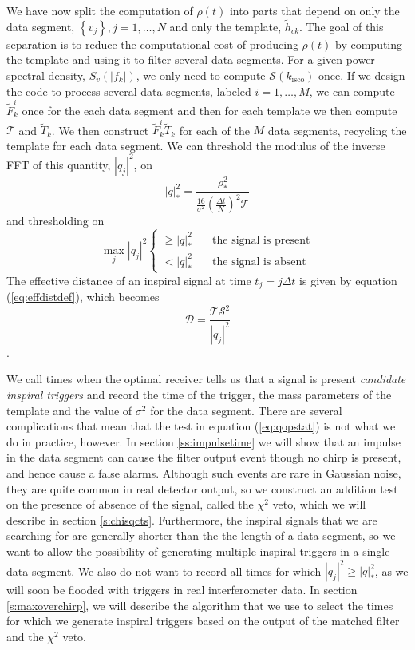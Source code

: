 We have now split the computation of $\rho(t)$ into parts that depend on only
the data segment, $\left\{v_j\right\}, j = 1,\ldots,N$ and only the template,
$\tilde{h}_{ck}$. The goal of this separation is to reduce the computational
cost of producing $\rho(t)$ by computing the template and using it to filter
several data segments. For a given power spectral density, $S_v(|f_k|)$, we
only need to compute $\mathcal{S}(k_\mathrm{isco})$ once. If we design the
code to process several data segments, labeled $i = 1,\ldots,M$, we can
compute $\tilde{F}_k^i$ once for the each data segment and then for each
template we then compute $\mathcal{T}$ and $\tilde{T}_k$. We then construct
$\tilde{F}_k^i\tilde{T}_k$ for each of the $M$ data segments, recycling the
template for each data segment. We can threshold the modulus of the inverse
FFT of this quantity, $|q_j|^2$, on
\begin{equation}
|q|^2_\ast = \frac{\rho^2_\ast} 
{\frac{16}{\sigma^2}\left(\frac{\Delta t}{N}\right)^2 \mathcal{T}}
\end{equation}
and thresholding on 
\begin{equation}
\max_{j} |q_j|^2 
\begin{cases}
\ge |q|^2_\ast &\quad \text{the signal is present}\\
< |q|^2_\ast &\quad \text{the signal is absent}
\end{cases}
\label{eq:qopstat}
\end{equation}
The effective distance of an
inspiral signal at time $t_j = j\Delta t$ is given by equation
(\ref{eq:effdistdef}), which becomes
\begin{equation}
\mathcal{D} = \frac{\mathcal{T}\mathcal{S}^2}{|q_j|^2}
\end{equation}.

We call times when the optimal receiver tells us that a signal is
present \emph{candidate inspiral triggers} and record the time of the trigger,
the mass parameters of the template and the value of $\sigma^2$ for the data
segment. There are several complications that mean that the test in equation
(\ref{eq:qopstat}) is not what we do in practice, however. In section
\ref{ss:impulsetime} we will show that an impulse in the data segment can
cause the filter output event though no chirp is present, and hence cause a
false alarms. Although such events are rare in Gaussian noise, they are quite
common in real detector output, so we construct an addition test on the
presence of absence of the signal, called the $\chi^2$ veto\cite{Allen:2004},
which we will describe in section \ref{s:chisqcts}. Furthermore, the inspiral
signals that we are searching for are generally shorter than the the length of
a data segment, so we want to allow the possibility of generating multiple
inspiral triggers in a single data segment. We also do not want to record all
times for which $|q_j|^2 \ge |q|^2_\ast$, as we will soon be flooded with
triggers in real interferometer data. In section \ref{s:maxoverchirp}, we will
describe the algorithm that we use to select the times for which we generate
inspiral triggers based on the output of the matched filter and the $\chi^2$
veto.

